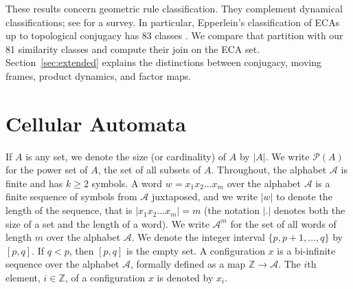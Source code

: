 \documentclass[11pt,a4paper]{article}
\newcommand{\rev}[1]{{\color{blue}#1}}
\newenvironment{revision}{\color{blue}}{}
\newcommand{\rev}[1]{{\color{black}#1}}
\newenvironment{revision}{\color{black}}{}
\begin{document}
\begin{revision}
These results concern geometric rule classification. They complement
dynamical classifications; see \cite{VISPOEL2022133074} for a survey.
In particular, Epperlein's classification of ECAs up to topological
conjugacy has 83 classes
\cite{epperlein2015classification,epperlein2017}.
We compare that partition with our 81 similarity classes and compute their
join on the ECA set. Section~\ref{sec:extended} explains the distinctions
between conjugacy, moving frames, product dynamics, and factor maps.
\end{revision}

\section{Cellular Automata}
\label{sec:CA}

If $A$ is any set, we denote the size (or cardinality) of $A$ by $|A|$.
We write $\mathcal{P}(A)$ for the power set of $A$, the set of all subsets of $A$.
\rev{Throughout, the alphabet $\mathcal{A}$ is finite and has $k\geq2$ symbols.}
A word $w=x_1x_2\ldots x_{m}$ over the alphabet $\mathcal{A}$ is a finite sequence of symbols
from $\mathcal{A}$ juxtaposed, and we write $|w|$ to \rev{denote the length} of the sequence,
that is $|x_1x_2\ldots x_{m}| = m$
(the notation $|.|$ denotes both the size of a set and the length of a word).
We write $\mathcal{A}^m$ for the set of all words of length $m$ over the alphabet $\mathcal{A}$.
We denote the integer interval $\{p, p+1, \ldots, q\}$ by $[p,q]$.
If $q < p$, then $[p,q]$ is the empty set.
A configuration $x$ is a bi-infinite sequence over
the alphabet $\mathcal{A}$, formally defined as a map $\mathbb{Z} \to \mathcal{A}$.
The \rev{$i$th} element, $i \in \mathbb{Z}$, of a configuration $x$ is denoted by $x_i$.
\end{document}
